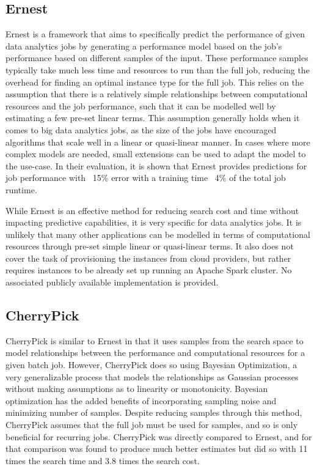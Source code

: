 \documentclass{report}
\begin{document}
\subsection{Ernest}
Ernest\cite{Venkataraman2016} is a framework that aims to specifically predict the performance of given data analytics jobs by generating a performance model based on the job's performance based on different samples of the input. These performance samples typically take much less time and resources to run than the full job, reducing the overhead for finding an optimal instance type for the full job. This relies on the assumption that there is a relatively simple relationships between computational resources and the job performance, such that it can be modelled well by estimating a few pre-set linear terms. This assumption generally holds when it comes to big data analytics jobs, as the size of the jobs have encouraged algorithms that scale well in a linear or quasi-linear manner\cite{Bottou2008}. In cases where more complex models are needed, small extensions can be used to adapt the model to the use-case. In their evaluation, it is shown that Ernest provides predictions for job performance with ~15\% error with a training time ~4\% of the total job runtime.

While Ernest is an effective method for reducing search cost and time without impacting predictive capabilities, it is very specific for data analytics jobs. It is unlikely that many other applications can be modelled in terms of computational resources through pre-set simple linear or quasi-linear terms. It also does not cover the task of provisioning the instances from cloud providers, but rather requires instances to be already set up running an Apache Spark cluster. No associated publicly available implementation is provided.

\subsection{CherryPick}
CherryPick \cite{Alipourfard2017} is similar to Ernest in that it uses samples from the search space to model relationships between the performance and computational resources for a given batch job. However, CherryPick does so using Bayesian Optimization, a very generalizable process that models the relationships as Gaussian processes without making assumptions as to linearity or monotonicity. Bayesian optimization has the added benefits of incorporating sampling noise and minimizing number of samples. Despite reducing samples through this method, CherryPick assumes that the full job must be used for samples, and so is only beneficial for recurring jobs. CherryPick was directly compared to Ernest, and for that comparison was found to produce much better estimates but did so with 11 times the search time and 3.8 times the search cost. 
\end{document}
